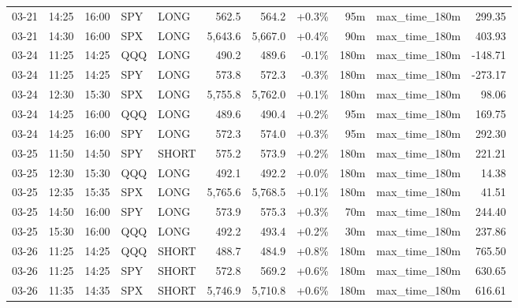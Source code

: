 \documentclass[11pt,a4paper,twoside]{article}
\begin{document}
\begin{center}
\begin{longtable}{>{\color{txtmain}}l l l l l r r r r >{\color{txtmain}}l r}
03-21 & 14:25 & 16:00 & SPY & LONG & 562.5 & 564.2 & \textcolor{wingreen}{+0.3\%} & 95m & max\_time\_180m & \textcolor{wingreen}{299.35} \\
03-21 & 14:30 & 16:00 & SPX & LONG & 5,643.6 & 5,667.0 & \textcolor{wingreen}{+0.4\%} & 90m & max\_time\_180m & \textcolor{wingreen}{403.93} \\
03-24 & 11:25 & 14:25 & QQQ & LONG & 490.2 & 489.6 & \textcolor{lossred}{-0.1\%} & 180m & max\_time\_180m & \textcolor{lossred}{-148.71} \\
03-24 & 11:25 & 14:25 & SPY & LONG & 573.8 & 572.3 & \textcolor{lossred}{-0.3\%} & 180m & max\_time\_180m & \textcolor{lossred}{-273.17} \\
03-24 & 12:30 & 15:30 & SPX & LONG & 5,755.8 & 5,762.0 & \textcolor{wingreen}{+0.1\%} & 180m & max\_time\_180m & \textcolor{wingreen}{98.06} \\
03-24 & 14:25 & 16:00 & QQQ & LONG & 489.6 & 490.4 & \textcolor{wingreen}{+0.2\%} & 95m & max\_time\_180m & \textcolor{wingreen}{169.75} \\
03-24 & 14:25 & 16:00 & SPY & LONG & 572.3 & 574.0 & \textcolor{wingreen}{+0.3\%} & 95m & max\_time\_180m & \textcolor{wingreen}{292.30} \\
03-25 & 11:50 & 14:50 & SPY & SHORT & 575.2 & 573.9 & \textcolor{wingreen}{+0.2\%} & 180m & max\_time\_180m & \textcolor{wingreen}{221.21} \\
03-25 & 12:30 & 15:30 & QQQ & LONG & 492.1 & 492.2 & \textcolor{wingreen}{+0.0\%} & 180m & max\_time\_180m & \textcolor{wingreen}{14.38} \\
03-25 & 12:35 & 15:35 & SPX & LONG & 5,765.6 & 5,768.5 & \textcolor{wingreen}{+0.1\%} & 180m & max\_time\_180m & \textcolor{wingreen}{41.51} \\
03-25 & 14:50 & 16:00 & SPY & LONG & 573.9 & 575.3 & \textcolor{wingreen}{+0.3\%} & 70m & max\_time\_180m & \textcolor{wingreen}{244.40} \\
03-25 & 15:30 & 16:00 & QQQ & LONG & 492.2 & 493.4 & \textcolor{wingreen}{+0.2\%} & 30m & max\_time\_180m & \textcolor{wingreen}{237.86} \\
03-26 & 11:25 & 14:25 & QQQ & SHORT & 488.7 & 484.9 & \textcolor{wingreen}{+0.8\%} & 180m & max\_time\_180m & \textcolor{wingreen}{765.50} \\
03-26 & 11:25 & 14:25 & SPY & SHORT & 572.8 & 569.2 & \textcolor{wingreen}{+0.6\%} & 180m & max\_time\_180m & \textcolor{wingreen}{630.65} \\
03-26 & 11:35 & 14:35 & SPX & SHORT & 5,746.9 & 5,710.8 & \textcolor{wingreen}{+0.6\%} & 180m & max\_time\_180m & \textcolor{wingreen}{616.61} \\

\end{longtable}
\end{center}
\end{document}
